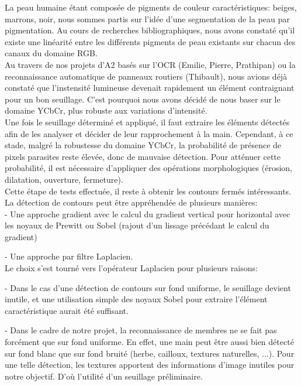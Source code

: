 \documentclass[10pt,a4paper]{report}
\begin{document}
La peau humaine étant composée de pigments de couleur caractéristiques: beiges, marrons, noir, nous sommes partis sur l'idée d'une segmentation de la peau par pigmentation. Au cours de recherches bibliographiques, nous avons constaté qu'il existe une linéarité entre les différents pigments de peau existants sur chacun des canaux du domaine RGB.\\
Au travers de nos projets d'A2 basés sur l'OCR (Emilie, Pierre, Prathipan) ou la reconnaissance automatique de panneaux routiers (Thibault), nous avions déjà constaté que l'instensité lumineuse devenait rapidement un élément contraignant pour un bon seuillage. C'est pourquoi nous avons décidé de nous baser sur le domaine YCbCr, plus robuste aux variations d'intensité.\\
\newline
Une fois le seuillage déterminé et appliqué, il faut extraire les éléments détectés afin de les analyser et décider de leur rapprochement à la main. Cependant, à ce stade, malgré la robustesse du domaine YCbCr, la probabilité de présence de pixels parasites reste élevée, donc de mauvaise détection. Pour atténuer cette probabilité, il est nécessaire d'appliquer des opérations morphologiques (érosion, dilatation, ouverture, fermeture).\\
Cette étape de tests effectuée, il reste à obtenir les contours fermés intéressants. La détection de contours peut être appréhendée de plusieurs manières:\\

	- Une approche gradient avec le calcul du gradient vertical pour horizontal avec les noyaux de Prewitt ou Sobel (rajout d'un lissage précédant le calcul du gradient)
	
	- Une approche par filtre Laplacien.\\
	\newline
Le choix s'est tourné vers l'opérateur Laplacien pour plusieurs raisons:

	- Dans le cas d'une détection de contours sur fond uniforme, le seuillage devient inutile, et une utilisation simple des noyaux Sobel pour extraire l'élément caractéristique aurait été suffisant.
	
	- Dans le cadre de notre projet, la reconnaissance de membres ne se fait pas forcément que sur fond uniforme. En effet, une main peut être aussi bien détecté sur fond blanc que sur fond bruité (herbe, cailloux, textures naturelles, ...). Pour une telle détection, les textures apportent des informations d'image inutiles pour notre objectif. D'où l'utilité d'un seuillage préliminaire.
	
\end{document}
